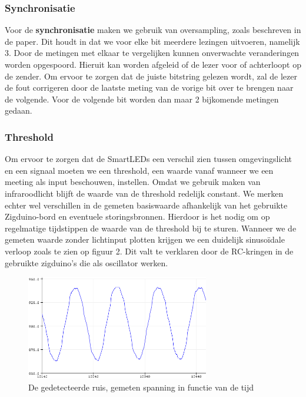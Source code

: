 \documentclass{article}
\begin{document}
\subsubsection{Synchronisatie}

 Voor de \textbf{synchronisatie} maken we gebruik van oversampling, zoals beschreven in de paper. Dit houdt in dat we voor elke bit meerdere lezingen uitvoeren, namelijk 3. Door de metingen met elkaar te vergelijken kunnen onverwachte veranderingen worden opgespoord. Hieruit kan worden afgeleid of de lezer voor of achterloopt op de zender. Om ervoor te zorgen dat de juiste bitstring gelezen wordt, zal de lezer de fout corrigeren door de laatste meting van de vorige bit over te brengen naar de volgende. Voor de volgende bit worden dan maar 2 bijkomende metingen gedaan.
 
\subsubsection{Threshold}

Om ervoor te zorgen dat de SmartLEDs een verschil zien tussen omgevingslicht en een signaal moeten we een threshold, een waarde vanaf wanneer we een meeting als input beschouwen, instellen. Omdat we gebruik maken van infraroodlicht blijft de waarde van de threshold redelijk constant. We merken echter wel verschillen in de gemeten basiswaarde afhankelijk van het gebruikte Zigduino-bord en eventuele storingsbronnen. Hierdoor is het nodig om op regelmatige tijdstippen de waarde van de threshold bij te sturen. 
Wanneer we de gemeten waarde zonder lichtinput plotten krijgen we een duidelijk sinusoïdale verloop zoals te zien op figuur 2. Dit valt te verklaren door de RC-kringen in de gebruikte zigduino’s die als oscillator werken. \cite{oscillator}  

\begin{figure}
\centering
\includegraphics[width=8cm]{ruis.png}
\caption{De gedetecteerde ruis, gemeten spanning in functie van de tijd}
\label{fig:ruis}
\end{figure}
\end{document}
